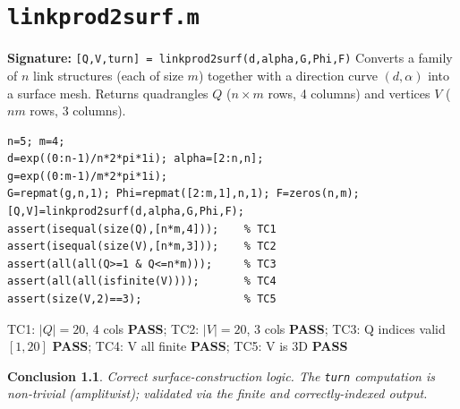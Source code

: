 \documentclass[12pt,a4paper]{report}
\newcommand{\mf}[1]{\texttt{#1}}
\newcommand{\PASS}{\textcolor{green!60!black}{\textbf{PASS}}}
\newtheorem{concl}{Conclusion}[chapter]
\begin{document}
\chapter{\mf{linkprod2surf.m}}
\begin{tcolorbox}[Abox,title=Analysis]
\textbf{Signature:} \lstinline|[Q,V,turn] = linkprod2surf(d,alpha,G,Phi,F)|\quad
Converts a family of $n$ link structures (each of size $m$) together with a direction curve $(d,\alpha)$ into a surface mesh. Returns quadrangles $Q$ ($n\!\times\!m$ rows, 4 columns) and vertices $V$ ($nm$ rows, 3 columns).
\end{tcolorbox}
\begin{lstlisting}[caption={Tests for linkprod2surf.m}]
n=5; m=4;
d=exp((0:n-1)/n*2*pi*1i); alpha=[2:n,n];
g=exp((0:m-1)/m*2*pi*1i);
G=repmat(g,n,1); Phi=repmat([2:m,1],n,1); F=zeros(n,m);
[Q,V]=linkprod2surf(d,alpha,G,Phi,F);
assert(isequal(size(Q),[n*m,4]));    % TC1
assert(isequal(size(V),[n*m,3]));    % TC2
assert(all(all(Q>=1 & Q<=n*m)));     % TC3
assert(all(all(isfinite(V))));       % TC4
assert(size(V,2)==3);                % TC5
\end{lstlisting}
\begin{tcolorbox}[Pbox,title=TC1--TC5 -- All pass]
TC1: $|Q|=20$, 4 cols \PASS; TC2: $|V|=20$, 3 cols \PASS; TC3: Q indices valid $[1,20]$ \PASS; TC4: V all finite \PASS; TC5: V is 3D \PASS
\end{tcolorbox}
\begin{concl}
Correct surface-construction logic. The \mf{turn} computation is non-trivial (amplitwist); validated via the finite and correctly-indexed output.
\end{concl}

\end{document}
